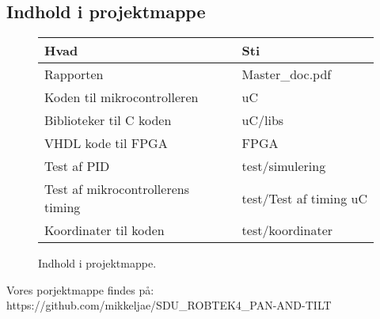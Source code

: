 \newpage

\tableofcontents
\listoffigures
\listoftables  

\subsection*{Indhold i projektmappe}
\begin{figure}[th!]
\centering
\begin{tabular}{l|l}
Hvad&Sti\\\hline
Rapporten&Master\_doc.pdf\\
Koden til mikrocontrolleren &uC\\
Biblioteker til C koden&uC/libs\\
VHDL kode til FPGA &FPGA\\
Test af PID &test/simulering\\
Test af mikrocontrollerens timing&test/Test af timing uC\\
Koordinater til koden &test/koordinater\\

\end{tabular}
\captionsetup{type=table, width=0.6\textwidth}
\caption*{Indhold i projektmappe. \label{tb:CD}}
\end{figure}

Vores porjektmappe findes på:  https://github.com/mikkeljae/SDU\_ROBTEK4\_PAN-AND-TILT


 \listoftodos